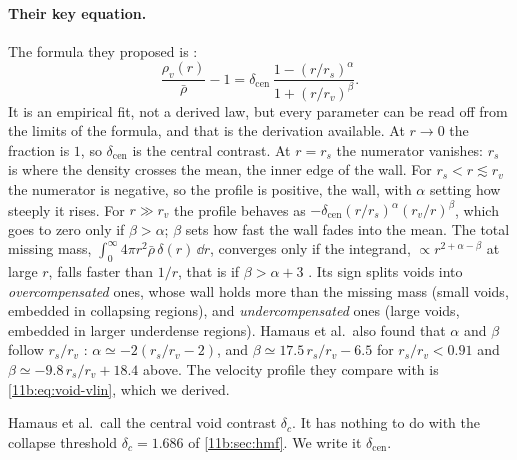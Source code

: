 \paragraph{Their key equation.}
The formula they proposed is :
\begin{equation}
  \frac{\rho_v(r)}{\bar\rho}-1=\delta_{\mathrm{cen}}\,
  \frac{1-(r/r_s)^{\alpha}}{1+(r/r_v)^{\beta}} .
  \label{11b:eq:hamaus}
\end{equation}
It is an empirical fit, not a derived law, but every parameter can be read off from
the limits of the formula, and that is the derivation available. At $r\to0$ the
fraction is $1$, so $\delta_{\mathrm{cen}}$ is the central contrast. At $r=r_s$ the
numerator vanishes: $r_s$ is where the density crosses the mean, the inner edge of
the wall. For $r_s<r\lesssim r_v$ the numerator is negative, so the profile is
positive, the wall, with $\alpha$ setting how steeply it rises. For $r\gg r_v$ the
profile behaves as $-\delta_{\mathrm{cen}}(r/r_s)^\alpha(r_v/r)^\beta$, which goes to
zero only if $\beta>\alpha$; $\beta$ sets how fast the wall fades into the mean.
The total missing mass, $\int_0^\infty4\pi r^2\bar\rho\,\delta(r)\,\dd r$, converges
only if the integrand, $\propto r^{2+\alpha-\beta}$ at large $r$, falls faster than
$1/r$, that is if $\beta>\alpha+3$ . Its sign
splits voids into \emph{overcompensated} ones, whose wall holds more than the
missing mass (small voids, embedded in collapsing regions), and
\emph{undercompensated} ones (large voids, embedded in larger underdense regions).
Hamaus et al.\ also found that $\alpha$ and $\beta$ follow $r_s/r_v$
:
$\alpha\simeq-2(r_s/r_v-2)$, and
$\beta\simeq17.5\,r_s/r_v-6.5$ for $r_s/r_v<0.91$ and
$\beta\simeq-9.8\,r_s/r_v+18.4$ above. The velocity profile they compare with is
\eqref{11b:eq:void-vlin}, which we derived.

\begin{pitfall}
Hamaus et al.\ call the central void contrast $\delta_c$. It has nothing to do
with the collapse threshold $\delta_c=1.686$ of \cref{11b:sec:hmf}. We write it
$\delta_{\mathrm{cen}}$.
\end{pitfall}

